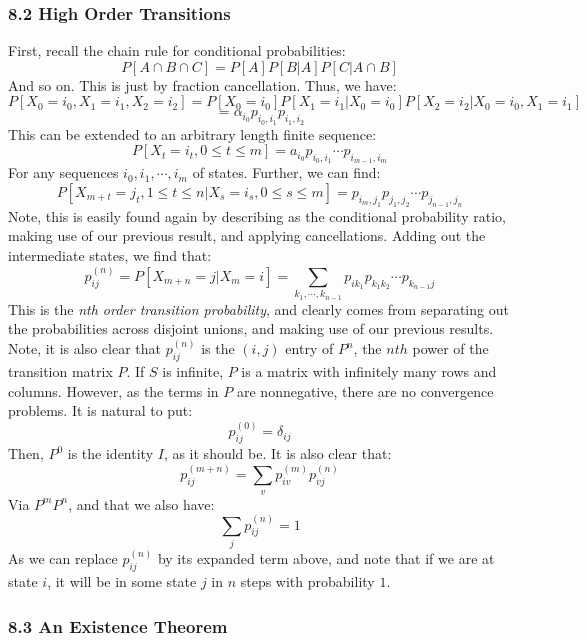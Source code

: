 \documentclass[12pt,a4paper]{article}
\newcommand{\1}[1]{\mathbbm{1}\left\{ #1 \right\}}
\begin{document}
\subsubsection{8.2 High Order Transitions} First, recall the chain rule for conditional probabilities:
$$
	P[A \cap B \cap C] = P[A] P[B | A] P[C | A \cap B]
$$
And so on. This is just by fraction cancellation. Thus, we have:
$$
	P[X_0 = i_0, X_1 = i_1, X_2 = i_2] =
	P[X_0 = i_0] P[X_1 = i_1 | X_0 = i_0] P[X_2 = i_2 | X_0 = i_0, X_1 = i_1]
$$
$$
	= \alpha_{i_0} p_{i_0, i_1} p_{i_1, i_2}
$$
This can be extended to an arbitrary length finite sequence:
$$
	P[X_t = i_t, 0 \leq t \leq m] = a_{i_0} p_{i_0, i_1} \cdots p_{i_{m-1},i_m}
$$
For any sequences $i_0, i_1, \cdots, i_m$ of states. Further, we can find:
$$
	P[X_{m+t} = j_t, 1 \leq t \leq n | X_s = i_s, 0 \leq s \leq m] =
	p_{i_m,j_1} p_{j_1,j_2} \cdots p_{j_{n-1},j_n}
$$
Note, this is easily found again by describing as the conditional probability ratio, making use of our previous result, and applying cancellations. Adding out the intermediate states, we find that:
$$
	p_{ij}^{(n)} = P[X_{m + n} = j | X_m = i] =
	\sum_{k_1, \cdots, k_{n-1}} p_{ik_1}p_{k_1k_2} \cdots p_{k_{n-1}j}
$$
This is the \textit{nth order transition probability}, and clearly comes from separating out the probabilities across disjoint unions, and making use of our previous results. Note, it is also clear that $p_{ij}^{(n)}$ is the $(i,j)$ entry of $P^n$, the $nth$ power of the transition matrix $P$. If $S$ is infinite, $P$ is a matrix with infinitely many rows and columns. However, as the terms in $P$ are nonnegative, there are no convergence problems. It is natural to put:
$$
	p_{ij}^{(0)} = \delta_{ij}
$$
Then, $P^0$ is the identity $I$, as it should be. It is also clear that:
$$
	p_{ij}^{(m + n)} = \sum_v p_{iv}^{(m)}p_{vj}^{(n)}
$$
Via $P^mP^n$, and that we also have:
$$
	\sum_j p_{ij}^{(n)} = 1
$$
As we can replace $p_{ij}^{(n)}$ by its expanded term above, and note that if we are at state $i$, it will be in some state $j$ in $n$ steps with probability $1$.

\subsubsection{8.3 An Existence Theorem}
\end{document}
